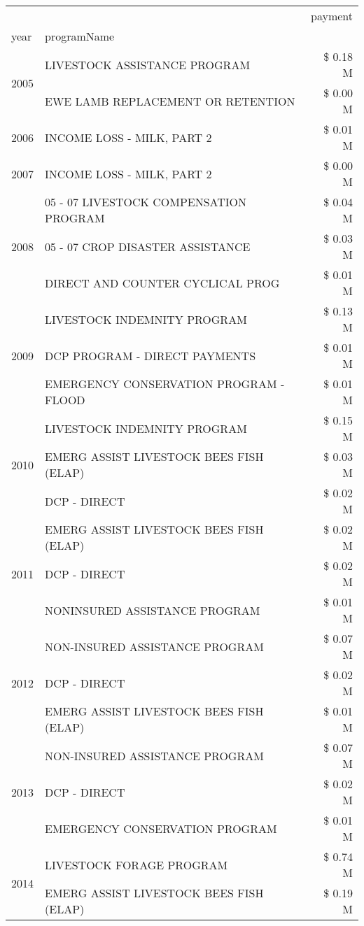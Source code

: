 \begin{tabular}{llr}
\toprule
 &  & payment \\
year & programName &  \\
\midrule
\multirow[t]{2}{*}{2005} & LIVESTOCK ASSISTANCE PROGRAM & \$ 0.18 M \\
 & EWE LAMB REPLACEMENT OR RETENTION & \$ 0.00 M \\
\cline{1-3}
2006 & INCOME LOSS - MILK, PART 2 & \$ 0.01 M \\
\cline{1-3}
2007 & INCOME LOSS - MILK, PART 2 & \$ 0.00 M \\
\cline{1-3}
\multirow[t]{3}{*}{2008} & 05 - 07 LIVESTOCK COMPENSATION PROGRAM & \$ 0.04 M \\
 & 05 - 07 CROP DISASTER ASSISTANCE & \$ 0.03 M \\
 & DIRECT AND COUNTER CYCLICAL PROG & \$ 0.01 M \\
\cline{1-3}
\multirow[t]{3}{*}{2009} & LIVESTOCK INDEMNITY PROGRAM & \$ 0.13 M \\
 & DCP PROGRAM - DIRECT PAYMENTS & \$ 0.01 M \\
 & EMERGENCY CONSERVATION PROGRAM - FLOOD & \$ 0.01 M \\
\cline{1-3}
\multirow[t]{3}{*}{2010} & LIVESTOCK INDEMNITY PROGRAM & \$ 0.15 M \\
 & EMERG ASSIST LIVESTOCK BEES FISH (ELAP) & \$ 0.03 M \\
 & DCP - DIRECT & \$ 0.02 M \\
\cline{1-3}
\multirow[t]{3}{*}{2011} & EMERG ASSIST LIVESTOCK BEES FISH (ELAP) & \$ 0.02 M \\
 & DCP - DIRECT & \$ 0.02 M \\
 & NONINSURED ASSISTANCE PROGRAM & \$ 0.01 M \\
\cline{1-3}
\multirow[t]{3}{*}{2012} & NON-INSURED ASSISTANCE PROGRAM & \$ 0.07 M \\
 & DCP - DIRECT & \$ 0.02 M \\
 & EMERG ASSIST LIVESTOCK BEES FISH (ELAP) & \$ 0.01 M \\
\cline{1-3}
\multirow[t]{3}{*}{2013} & NON-INSURED ASSISTANCE PROGRAM & \$ 0.07 M \\
 & DCP - DIRECT & \$ 0.02 M \\
 & EMERGENCY CONSERVATION PROGRAM & \$ 0.01 M \\
\cline{1-3}
\multirow[t]{3}{*}{2014} & LIVESTOCK FORAGE PROGRAM & \$ 0.74 M \\
 & EMERG ASSIST LIVESTOCK BEES FISH (ELAP) & \$ 0.19 M \\

\end{tabular}
